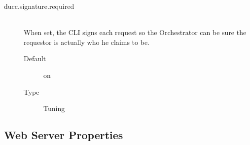 \begin{description}
        \item[ducc.signature.required] \hfill \\
          When set, the CLI signs each request so the Orchestrator can be sure the requestor is 
          actually who he claims to be. 
          \begin{description}            
            \item[Default] on             
            \item[Type] Tuning 
          \end{description}
      \end{description}  
        

\subsection{Web Server Properties}

